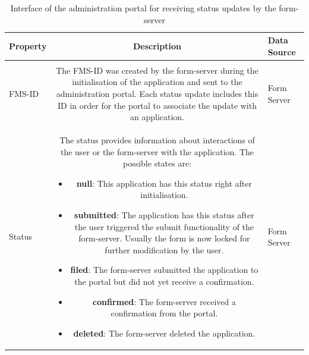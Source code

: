\documentclass[
     12pt,         %
     a4paper,      %
     BCOR=10mm,version=first,     %
     DIV=14,version=first,        %
     ]{scrreprt}
\begin{document}
        \begin{table}[!h]
            \begin{tabularx}{\textwidth}{|l|C|l|}
            \hline
            Property & Description & Data Source \\
            \hline
             \\
            \hline
            
            FMS-ID & The FMS-ID was created by the form-server during the initialisation of the application and sent to the administration portal. Each status update includes this ID in order for the portal to associate the update with an application. & Form Server \\
            
            \hline
            
            Status & The status provides information about interactions of the user or the form-server with the application. The possible states are:
            
            \begin{itemize}
                \item \textbf{null}: This application has this status right after initialisation.
                \item \textbf{submitted}: The application has this status after the user triggered the submit functionality of the form-server. Usually the form is now locked for further modification by the user.
                \item \textbf{filed}: The form-server submitted the application to the portal but did not yet receive a confirmation.
                \item \textbf{confirmed}: The form-server received a confirmation from the portal.
                \item \textbf{deleted}: The form-server deleted the application.
            \end{itemize}
            
            & Form Server \\
            \hline
            \end{tabularx}
            \caption{Interface of the administration portal for receiving status updates by the form-server}
            \label{table:interface_status}
        \end{table}
\end{document}
